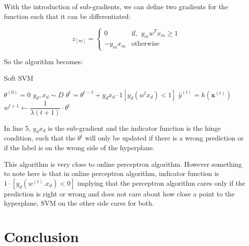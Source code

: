 \documentclass[11pt]{article}
\begin{document}
With the introduction of sub-gradients, we can define two gradients for the function such that it can be differentiated:

\begin{equation}
    z_{[m]} = 
    \begin{cases}
    0 & \text{if, }\ y_m w^T x_m \geq 1\\
    -y_{m}x_{m} & \text{otherwise} 
    \end{cases}
\end{equation}

So the algorithm becomes:


\begin{algorithm}[H]
\caption{Soft SVM}
\label{algo:SoftSVM}
\begin{algorithmic}[1]
\STATE $\theta^{(0)}=0$ \hfill
{}
\STATE $y_d,x_d \sim  D$ \hfill 
\STATE $\theta^{t}=\theta^{t-1}+ y_{d}x_{d} \cdot 1[y_d(w^{t}x_{d})<1]$ \hfill 
\STATE $\hat{y}^{(t)} = h(\textbf{x}^{(t)})$ \hfill 
\STATE $w^{t+1} \leftarrow \dfrac{1}{\lambda(t+1)} \cdot \theta^{t}$ \hfill
\ENDFOR
\end{algorithmic}
\end{algorithm}

In line 5, $y_{d}x_{d}$ is the sub-gradient and the indicator function is the hinge condition, such that the $\theta^{t}$ will only be updated if there is a wrong prediction or if the label is on the wrong side of the hyperplane.

This algorithm is very close to online perceptron algorithm. However something to note here is that in online perceptron algorithm, indicator function is $1\cdot[y_d(w^(t).x_d)<0]$ implying that the perceptron algorithm cares only if the prediction is right or wrong and does not care about how close a point to the hyperplane, SVM on the other side cares for both.

\section{Conclusion}
\end{document}
